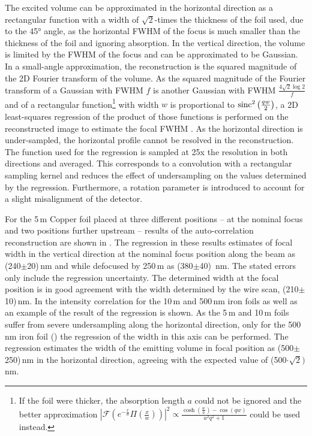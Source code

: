 The excited volume can be approximated in the horizontal direction as a rectangular function with a width of $\sqrt{2}$-times the thickness of the foil used, due to the 45° angle, as the horizontal FWHM of the focus is much smaller than the thickness of the foil and ignoring absorption.  In the vertical direction, the volume is limited by the FWHM of the focus and can be approximated to be Gaussian. 
In a small-angle approximation, the reconstruction is the squared magnitude of the 2D Fourier transform of the volume. As the squared magnitude of the Fourier transform of a Gaussian with FWHM $f$ is another Gaussian with FWHM $\frac{4\sqrt{2}\log{2}}{f}$ and of a rectangular function\footnote{If the foil were thicker, the absorption length $a$ could not be ignored and the better approximation $\left|\mathscr{F}\left(e^{-\frac{x}{a}} \Pi \left(\frac{x}{w}\right)\right)\right|^2 \propto \frac{\cosh \left(\frac{w}{a}\right)-\cos (q w)}{a^2 q^2+1}$
	could be used instead.} with width $w$ is proportional to $\operatorname{sinc}^2{\left(\frac{q w}{2}\right)}$, a 2D least-squares regression of the product of those functions is performed on the reconstructed image to estimate the focal FWHM \cite{butz2015}. As the horizontal direction is under-sampled, the horizontal profile cannot be resolved in the reconstruction.  The function used for the regression is sampled at 25x the resolution in both directions and averaged. This corresponds to a convolution with a rectangular sampling kernel and reduces the effect of undersampling on the values determined by the regression. Furthermore, a rotation parameter is introduced to account for a slight misalignment of the detector.

For the 5\,\textmu m Copper foil placed at three different positions -- at the nominal focus and two positions further upstream -- results of the auto-correlation reconstruction are shown in .
The regression in these results estimates of focal width in the vertical direction at the nominal focus position along the beam as (240$\pm$20)\,nm and while defocused by 250\,\textmu m as (380$\pm$40)\, nm. The stated errors only include the regression uncertainty. The determined width at the focal position is in good agreement with the width determined by the wire scan, (210$\pm$ 10)\,nm. In  the intensity correlation for the 10\,\textmu m and 500\,nm iron foils as well as an example of the result of the regression is shown. As the 5\,\textmu m and 10\,\textmu m foils suffer from severe undersampling along the horizontal direction, only for the 500\,nm iron foil () the regression of the width in this axis can be performed. The regression estimates the width of the emitting volume in focal position as (500$\pm$250)\,nm in the horizontal direction, agreeing with the expected value of (500$\cdot\sqrt{2})$\,nm.

